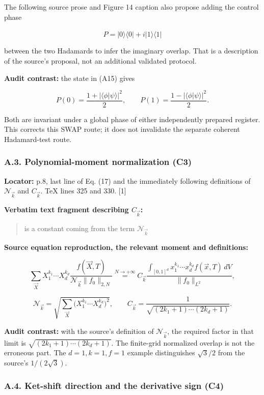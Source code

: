 The following source prose and Figure 14 caption also propose adding the
control phase

\[
\hat P=|0\rangle\langle0|+i|1\rangle\langle1|
\]

between the two Hadamards to infer the imaginary overlap. That is a
description of the source's proposal, not an additional validated
protocol.

\textbf{Audit contrast:} the state in (A15) gives

\[
P(0)=\frac{1+|\langle\phi|\psi\rangle|^2}{2},\qquad
P(1)=\frac{1-|\langle\phi|\psi\rangle|^2}{2}.
\]

Both are invariant under a global phase of either independently prepared
register. This corrects this SWAP route; it does not invalidate the
separate coherent Hadamard-test route.

\subsubsection{A.3. Polynomial-moment normalization
(C3)}\label{a.3.-polynomial-moment-normalization-c3}

\textbf{Locator:} p.8, last line of Eq. (17) and the immediately
following definitions of \(\mathcal N_{\vec k}\) and \(C_{\vec k}\). TeX
lines 325 and 330. {[}1{]}

\textbf{Verbatim text fragment describing \(C_{\vec k}\):}

\begin{quote}
is a constant coming from the term \(\mathcal{N}_{\vec{k}}\)
\end{quote}

\textbf{Source equation reproduction, the relevant moment and
definitions:}

\[
\sum_{\vec X}X_1^{k_1}\cdots X_d^{k_d}
\frac{f(\vec X,T)}{\mathcal N_{\vec k}\|f_0\|_{2,N}}
\overset{N\to+\infty}{=}
C_{\vec k}\frac{\int_{[0,1]^d}x_1^{k_1}\cdots x_d^{k_d}f(\vec x,T)\,dV}
{\|f_0\|_{L^2}},
\]

\[
\mathcal N_{\vec k}
=\sqrt{\sum_{\vec X}\bigl(X_1^{k_1}\cdots X_d^{k_d}\bigr)^2},
\qquad
C_{\vec k}=\frac{1}{\sqrt{(2k_1+1)\cdots(2k_d+1)}}.
\]

\textbf{Audit contrast:} with the source's definition of
\(\mathcal N_{\vec k}\), the required factor in that limit is
\(\sqrt{(2k_1+1)\cdots(2k_d+1)}\). The finite-grid normalized overlap is
not the erroneous part. The \(d=1,k=1,f=1\) example distinguishes
\(\sqrt3/2\) from the source's \(1/(2\sqrt3)\).

\subsubsection{A.4. Ket-shift direction and the derivative sign
(C4)}\label{a.4.-ket-shift-direction-and-the-derivative-sign-c4}

